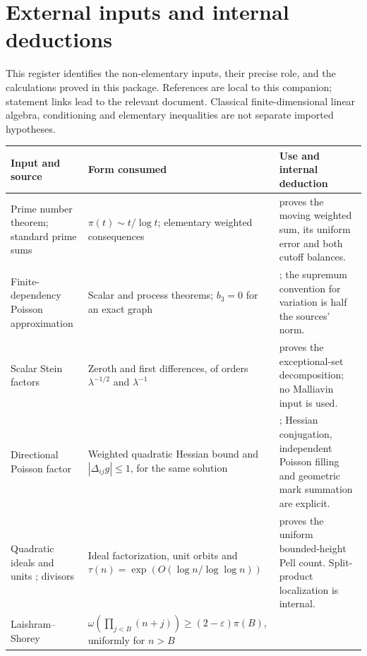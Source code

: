 \section*{External inputs and internal deductions}
This register identifies the non-elementary inputs, their precise role,
and the calculations proved in this package. References are local to this
companion; statement links lead to the relevant document. Classical
finite-dimensional linear algebra, conditioning and elementary inequalities
are not separate imported hypotheses.

\begingroup
\small
\renewcommand{\arraystretch}{1.16}
\noindent\begin{tabularx}{\textwidth}{@{}L{.225\textwidth}L{.315\textwidth}>{\raggedright\arraybackslash}X@{}}
\toprule
Input and source & Form consumed & Use and internal deduction\\\midrule
Prime number theorem; standard prime sums \cite{Tenenbaum2015}
& $\pi(t)\sim t/\log t$; elementary weighted consequences
&  proves the moving weighted sum, its uniform error and both cutoff balances.\\
Finite-dependency Poisson approximation \cite{ArratiaGoldsteinGordon1989,ArratiaGoldsteinGordon1990}
& Scalar and process theorems; $b_3=0$ for an exact graph
& ; the supremum convention for variation is half the sources' norm.\\
Scalar Stein factors \cite[(2.15)]{Krokowski2017}
& Zeroth and first differences, of orders $\lambda^{-1/2}$ and $\lambda^{-1}$
&  proves the exceptional-set decomposition; no Malliavin input is used.\\
Directional Poisson factor \cite[p.~179, Lemmas~2--3]{Barbour1988SteinProcess}
& Weighted quadratic Hessian bound and $|\Delta_{ij}g|\le1$, for the same solution
& ; Hessian conjugation, independent Poisson filling and geometric mark summation are explicit.\\
Quadratic ideals and units \cite{HalterKoch2013}; divisors \cite{NicolasRobin1983}
& Ideal factorization, unit orbits and $\tau(n)=\exp(O(\log n/\log\log n))$
&  proves the uniform bounded-height Pell count. Split-product localization is internal.\\
Laishram--Shorey \cite[eq.~(14), p.~331]{LaishramShorey2004}
& $\omega(\prod_{j<B}(n+j))\ge(2-\varepsilon)\pi(B)$, uniformly for $n>B$

\end{tabularx}

